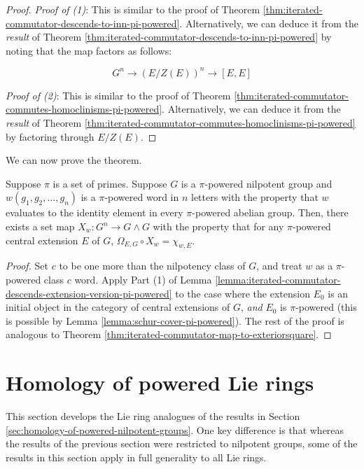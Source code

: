\begin{proof}
  {\em Proof of (1)}: This is similar to the proof of Theorem
  \ref{thm:iterated-commutator-descends-to-inn-pi-powered}. Alternatively, we can
  deduce it from the {\em result} of Theorem
  \ref{thm:iterated-commutator-descends-to-inn-pi-powered} by noting that the
  map factors as follows:

  $$G^n \to (E/Z(E))^n \to [E,E]$$

  {\em Proof of (2)}: This is similar to the proof of Theorem
  \ref{thm:iterated-commutator-commutes-homoclinisms-pi-powered}. Alternatively,
  we can deduce it from the {\em result} of Theorem
  \ref{thm:iterated-commutator-commutes-homoclinisms-pi-powered} by factoring
  through $E/Z(E)$.
\end{proof}

We can now prove the theorem.

\begin{theorem}\label{thm:iterated-commutator-map-to-exteriorsquare-pi-powered}
  Suppose $\pi$ is a set of primes. Suppose $G$ is a $\pi$-powered
  nilpotent group and $w(g_1,g_2,\dots,g_n)$ is a $\pi$-powered word
  in $n$ letters with the property that $w$ evaluates to the identity
  element in every $\pi$-powered abelian group. Then, there exists a
  set map $X_w:G^n \to G \wedge G$ with the property that for any
  $\pi$-powered central extension $E$ of $G$, $\Omega_{E,G} \circ X_w
  = \chi_{w,E}$.
\end{theorem}

\begin{proof}
  Set $c$ to be one more than the nilpotency class of $G$, and treat
  $w$ as a $\pi$-powered class $c$ word. Apply Part (1) of Lemma
  \ref{lemma:iterated-commutator-descends-extension-version-pi-powered}
  to the case where the extension $E_0$ is an initial object in the
  category of central extensions of $G$, {\em and} $E_0$ is
  $\pi$-powered (this is possible by Lemma
  \ref{lemma:schur-cover-pi-powered}). The rest of the proof is
  analogous to Theorem
  \ref{thm:iterated-commutator-map-to-exteriorsquare}.
\end{proof}


\section{Homology of powered Lie rings}\label{sec:homology-of-powered-nilpotent-lie-rings}

This section develops the Lie ring analogues of the results in Section
\ref{sec:homology-of-powered-nilpotent-groups}. One key difference is
that whereas the results of the previous section were restricted to
nilpotent groups, some of the results in this section apply in full
generality to all Lie rings.

